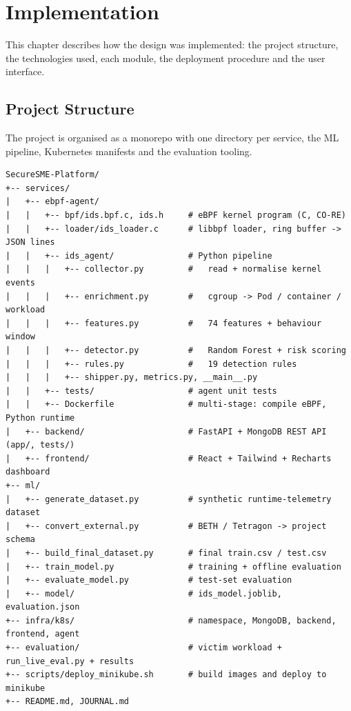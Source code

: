\chapter{Implementation}

This chapter describes how the design was implemented: the project structure, the
technologies used, each module, the deployment procedure and the user interface.

\section{Project Structure}

The project is organised as a monorepo with one directory per service, the ML
pipeline, Kubernetes manifests and the evaluation tooling.

\begin{lstlisting}[basicstyle=\ttfamily\scriptsize]
SecureSME-Platform/
+-- services/
|   +-- ebpf-agent/
|   |   +-- bpf/ids.bpf.c, ids.h     # eBPF kernel program (C, CO-RE)
|   |   +-- loader/ids_loader.c      # libbpf loader, ring buffer -> JSON lines
|   |   +-- ids_agent/               # Python pipeline
|   |   |   +-- collector.py         #   read + normalise kernel events
|   |   |   +-- enrichment.py        #   cgroup -> Pod / container / workload
|   |   |   +-- features.py          #   74 features + behaviour window
|   |   |   +-- detector.py          #   Random Forest + risk scoring
|   |   |   +-- rules.py             #   19 detection rules
|   |   |   +-- shipper.py, metrics.py, __main__.py
|   |   +-- tests/                   # agent unit tests
|   |   +-- Dockerfile               # multi-stage: compile eBPF, Python runtime
|   +-- backend/                     # FastAPI + MongoDB REST API (app/, tests/)
|   +-- frontend/                    # React + Tailwind + Recharts dashboard
+-- ml/
|   +-- generate_dataset.py          # synthetic runtime-telemetry dataset
|   +-- convert_external.py          # BETH / Tetragon -> project schema
|   +-- build_final_dataset.py       # final train.csv / test.csv
|   +-- train_model.py               # training + offline evaluation
|   +-- evaluate_model.py            # test-set evaluation
|   +-- model/                       # ids_model.joblib, evaluation.json
+-- infra/k8s/                       # namespace, MongoDB, backend, frontend, agent
+-- evaluation/                      # victim workload + run_live_eval.py + results
+-- scripts/deploy_minikube.sh       # build images and deploy to minikube
+-- README.md, JOURNAL.md
\end{lstlisting}

